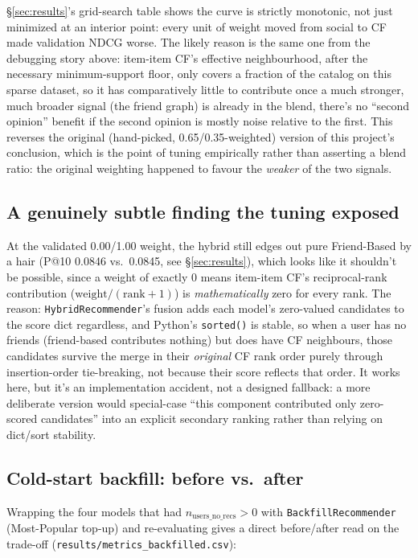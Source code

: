 \documentclass[11pt,a4paper]{article}
\newcommand{\code}[1]{\texttt{#1}}
\newcommand{\secref}[1]{\S\ref{#1}}
\begin{document}
\secref{sec:results}'s grid-search table shows the curve is strictly monotonic, not just minimized at an interior point: every unit of weight moved from social to CF made validation NDCG worse. The likely reason is the same one from the debugging story above: item-item CF's effective neighbourhood, after the necessary minimum-support floor, only covers a fraction of the catalog on this sparse dataset, so it has comparatively little to contribute once a much stronger, much broader signal (the friend graph) is already in the blend, there's no ``second opinion'' benefit if the second opinion is mostly noise relative to the first. This reverses the original (hand-picked, 0.65/0.35-weighted) version of this project's conclusion, which is the point of tuning empirically rather than asserting a blend ratio: the original weighting happened to favour the \emph{weaker} of the two signals.

\subsection{A genuinely subtle finding the tuning exposed}

At the validated 0.00/1.00 weight, the hybrid still edges out pure Friend-Based by a hair (P@10 0.0846 vs.\ 0.0845, see \secref{sec:results}), which looks like it shouldn't be possible, since a weight of exactly 0 means item-item CF's reciprocal-rank contribution ($\text{weight}/(\text{rank}+1)$) is \emph{mathematically} zero for every rank. The reason: \code{HybridRecommender}'s fusion adds each model's zero-valued candidates to the score dict regardless, and Python's \code{sorted()} is stable, so when a user has no friends (friend-based contributes nothing) but does have CF neighbours, those candidates survive the merge in their \emph{original} CF rank order purely through insertion-order tie-breaking, not because their score reflects that order. It works here, but it's an implementation accident, not a designed fallback: a more deliberate version would special-case ``this component contributed only zero-scored candidates'' into an explicit secondary ranking rather than relying on dict/sort stability.

\subsection{Cold-start backfill: before vs.\ after}

Wrapping the four models that had $n_{\text{users\_no\_recs}} > 0$ with \code{BackfillRecommender} (Most-Popular top-up) and re-evaluating gives a direct before/after read on the trade-off (\code{results/metrics\_backfilled.csv}):
\end{document}

